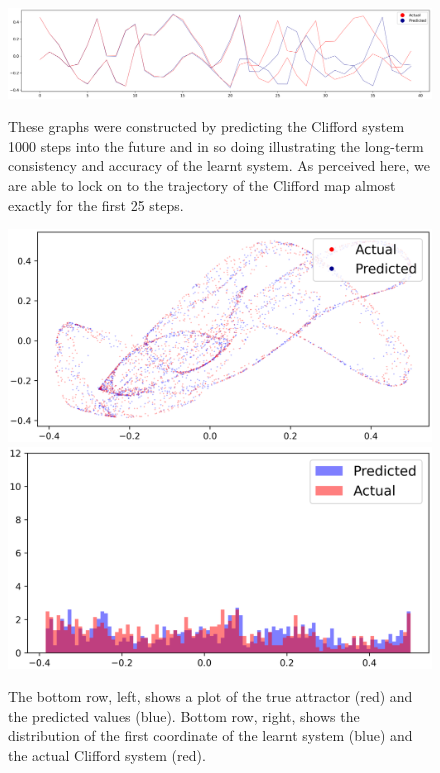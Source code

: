 \begin{figure}[ht]
  \centering
  \includegraphics[width=1.0\textwidth,left]{Graphs/_Clifford_1_nonoise.eps}
  \caption*{These graphs were constructed by predicting the Clifford system 1000 steps into the future and in so doing illustrating the long-term consistency and accuracy of the learnt system. As perceived here, we are able to lock on to the trajectory of the Clifford map almost exactly for the first 25 steps.}
      \centering
      \includegraphics[width=\linewidth]{Graphs/_Clifford_2_nonoise.eps}
  \endminipage\hfill
    \centering
    \includegraphics[width=\linewidth]{Graphs/_Clifford_3_nonoise.eps}
  \endminipage
  \caption{The bottom row, left, shows a plot of the true attractor (red) and the predicted values (blue). Bottom row, right, shows the distribution of the first coordinate of the learnt system (blue) and the actual Clifford system (red). }
  \label{fig:Clifford}
\end{figure}

